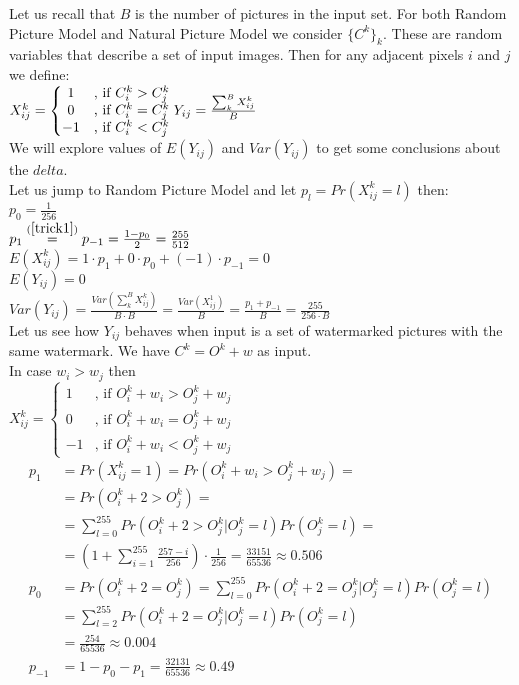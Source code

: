 \documentclass[varwidth]{standalone}
\begin{document}
Let us recall that $B$ is the number of pictures in the input set.
For both Random Picture Model and Natural Picture Model we consider $\{C^k\}_k$.
These are random variables that describe a set of input images. Then
for any adjacent pixels $i$ and $j$ we
define:\\
$X^k_{ij} =
\left\{
\begin{matrix}
1 & \text{, if } C^k_i > C^k_j\\
0 & \text{, if } C^k_i = C^k_j\\
-1 & \text{, if } C^k_i < C^k_j
\end{matrix}\right.\\
Y_{ij} = \frac{\sum^B_k X^k_{ij}}{B}$\\
We will explore values of $E(Y_{ij})$ and $Var(Y_{ij})$ to get some conclusions
about the $delta$.\\
Let us jump to Random Picture Model and let $p_l = Pr(X^k_{ij} = l)$ then:\\
$p_0 = \frac{1}{256}$\\
$p_1 \stackrel{(\ref{trick1})}{=} p_{-1} = \frac{1-p_0}{2} = \frac{255}{512}$\\
$E(X^k_{ij}) = 1\cdot p_1 + 0\cdot p_0 + (-1)\cdot p_{-1} = 0$\\
$E(Y_{ij}) = 0$\\
$Var(Y_{ij}) = \frac{Var(\sum^B_k X^k_{ij})}{B\cdot B} = \frac{Var(X^1_{ij})}{B} = \frac{p_1 + p_{-1}}{B} = \frac{255}{256\cdot B}$\\
Let us see how $Y_{ij}$ behaves when input is a set of watermarked pictures with
the same watermark. We have $C^k = O^k + w$ as input.\\
In case $w_i > w_j$ then\\
$X^k_{ij} =
\left\{
\begin{matrix}
1 & \text{, if } O^k_i + w_i > O^k_j + w_j\\
0 & \text{, if } O^k_i + w_i = O^k_j + w_j\\
-1 & \text{, if } O^k_i + w_i < O^k_j + w_j
\end{matrix}\right.$\\
\begin{align*}
p_1 &= Pr(X^k_{ij} = 1) = Pr(O^k_i + w_i > O^k_j + w_j) =\\
    &= Pr(O^k_i + 2 > O^k_j) =\\
    &= \sum_{l=0}^{255} Pr(O^k_i + 2 > O^k_j | O^k_j = l)Pr(O^k_j = l) =\\
    &= \left(1 + \sum_{i=1}^{255} \frac{257-i}{256}\right)\cdot \frac{1}{256} = \frac{33151}{65536}\approx 0.506\\
p_0 &= Pr(O^k_i + 2 = O^k_j) = \sum_{l=0}^{255} Pr(O^k_i + 2 = O^k_j | O^k_j = l)Pr(O^k_j = l)\\
    &= \sum_{l=2}^{255} Pr(O^k_i + 2 = O^k_j | O^k_j = l)Pr(O^k_j = l)\\
    &= \frac{254}{65536} \approx 0.004\\
p_{-1} &= 1 - p_0 - p_1 = \frac{32131}{65536} \approx 0.49
\end{align*}\\
\end{document}
